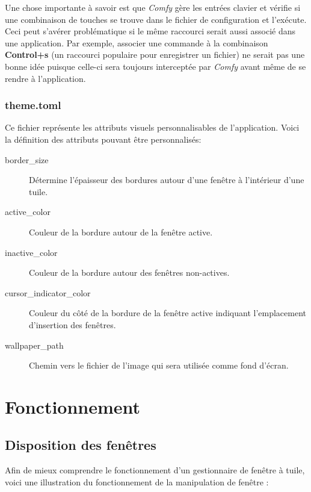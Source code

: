 \documentclass[titlepage]{article}
\begin{document}
\par
\bigskip
Une chose importante à savoir est que \textit{Comfy} gère les entrées clavier et
vérifie si une combinaison de touches se trouve dans le fichier de configuration
et l'exécute. Ceci peut s'avérer problématique si le même raccourci serait aussi
associé dans une application. Par exemple, associer une commande à la
combinaison \textbf{Control+s} (un raccourci populaire pour enregistrer un
fichier) ne serait pas une bonne idée puisque celle-ci sera toujours interceptée
par \textit{Comfy} avant même de se rendre à l'application.

\subsubsection{theme.toml}
\begin{minipage}{\linewidth}
	
\end{minipage}

\par
Ce fichier représente les attributs visuels personnalisables de l'application.
Voici la définition des attributs pouvant être personnalisés:
\begin{description}
	\item [border\_size]
		Détermine l'épaisseur des bordures autour d'une fenêtre à l'intérieur d'une
		tuile.
	\item [active\_color]
		Couleur de la bordure autour de la fenêtre active.
	\item [inactive\_color]
		Couleur de la bordure autour des fenêtres non-actives.
	\item [cursor\_indicator\_color]
		Couleur du côté de la bordure de la fenêtre active indiquant l'emplacement
		d'insertion des fenêtres.
	\item [wallpaper\_path]
		Chemin vers le fichier de l'image qui sera utilisée comme fond d'écran.
\end{description}

\section{Fonctionnement}
\subsection{Disposition des fenêtres}
\par
Afin de mieux comprendre le fonctionnement d'un gestionnaire de fenêtre à tuile,
voici une illustration du fonctionnement de la manipulation de fenêtre :
\bigskip
\end{document}
